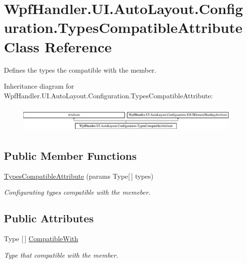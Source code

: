 \hypertarget{class_wpf_handler_1_1_u_i_1_1_auto_layout_1_1_configuration_1_1_types_compatible_attribute}{}\section{Wpf\+Handler.\+U\+I.\+Auto\+Layout.\+Configuration.\+Types\+Compatible\+Attribute Class Reference}
\label{class_wpf_handler_1_1_u_i_1_1_auto_layout_1_1_configuration_1_1_types_compatible_attribute}


Defines the types the compatible with the member.  


Inheritance diagram for Wpf\+Handler.\+U\+I.\+Auto\+Layout.\+Configuration.\+Types\+Compatible\+Attribute\+:\begin{figure}[H]
\begin{center}
\leavevmode
\includegraphics[height=1.365854cm]{dc/d7e/class_wpf_handler_1_1_u_i_1_1_auto_layout_1_1_configuration_1_1_types_compatible_attribute}
\end{center}
\end{figure}
\subsection*{Public Member Functions}
\begin{DoxyCompactItemize}
\item 
\mbox{\hyperlink{class_wpf_handler_1_1_u_i_1_1_auto_layout_1_1_configuration_1_1_types_compatible_attribute_ac09e68049269ba7b1edc9992757828f8}{Types\+Compatible\+Attribute}} (params Type\mbox{[}$\,$\mbox{]} types)
\begin{DoxyCompactList}\small\item\em Configurating types compatible with the memeber. \end{DoxyCompactList}\end{DoxyCompactItemize}
\subsection*{Public Attributes}
\begin{DoxyCompactItemize}
\item 
Type \mbox{[}$\,$\mbox{]} \mbox{\hyperlink{class_wpf_handler_1_1_u_i_1_1_auto_layout_1_1_configuration_1_1_types_compatible_attribute_ab3b6ed5958eae83d1a8d0b3d5cafed54}{Compatible\+With}}
\begin{DoxyCompactList}\small\item\em Type that compatible with the member. \end{DoxyCompactList}\end{DoxyCompactItemize}


